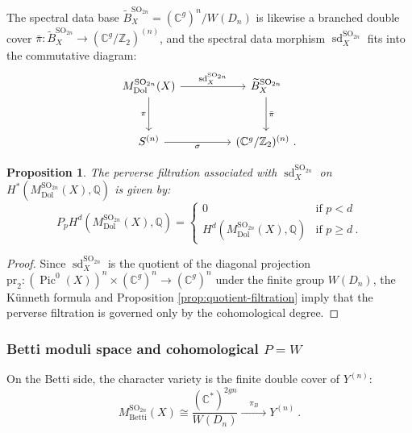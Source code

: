 \documentclass[11pt, a4paper]{amsart}
\newtheorem{proposition}[theorem]{Proposition}
\theoremstyle{definition}
\theoremstyle{myitemstyle}
\DeclareMathOperator{\Pic}{Pic}
\DeclareMathOperator{\SO}{SO}
\newcommand{\Dol}{{\mathrm{Dol}}}
\newcommand{\Betti}{{\mathrm{Betti}}}
\newcommand{\sd}{{\operatorname{sd}}}
\begin{document}
The spectral data base $\widetilde{B}^{\SO_{2n}}_X = (\mathbb{C}^g)^n / W(D_n)$ is likewise a branched double cover $\bar{\pi} \colon \widetilde{B}^{\SO_{2n}} _X\to (\mathbb{C}^g/\mathbb{Z}_2)^{(n)}$, and the spectral data morphism $\sd^{\SO_{2n}}_X$ fits into the commutative diagram:
\begin{equation}\label{eq:diagram-Dn-cover}
\begin{tikzcd}[row sep=3em, column sep=4.5em]
M_{\Dol}^{\SO_{2n}}(X) \arrow[r, "\sd_X^{\SO_{2n}}"] \arrow[d, "\pi"']
    & \widetilde{B}^{\SO_{2n}}_X \arrow[d, "\bar{\pi}"] \\
S^{(n)} \arrow[r, "\sigma"']
    & (\mathbb{C}^g/\mathbb{Z}_2)^{(n)}\ .
\end{tikzcd}
\end{equation}

\begin{proposition}\label{prop:Dn-Dolbeault-filtration}
The perverse filtration associated with $\sd^{\SO_{2n}}_X$ on $H^*(M_{\Dol}^{\SO_{2n}}(X), \mathbb{Q})$ is given by:
\[
P_p H^d(M_{\Dol}^{\SO_{2n}}(X), \mathbb{Q}) = 
\begin{cases} 
0 & \text{if } p < d \\ 
H^d(M_{\Dol}^{\SO_{2n}}(X), \mathbb{Q}) & \text{if } p \ge d\ . 
\end{cases}
\]
\end{proposition}
\begin{proof}
Since $\sd^{\SO_{2n}}_X$ is the quotient of the diagonal projection $\mathrm{pr}_2 \colon (\Pic^0(X))^n \times (\mathbb{C}^g)^n \to (\mathbb{C}^g)^n$ under the finite group $W(D_n)$, the K\"unneth formula and Proposition \ref{prop:quotient-filtration} imply that the perverse filtration is governed only by the cohomological degree.
\end{proof}

\subsubsection{Betti moduli space and cohomological $P=W$}
On the Betti side, the character variety is the finite double cover of $Y^{(n)}$:
\[
M_{\Betti}^{\SO_{2n}}(X) \cong \frac{(\mathbb{C}^*)^{2gn}}{W(D_n)} \xrightarrow{\quad \pi_B \quad} Y^{(n)}\ .
\]
\end{document}
